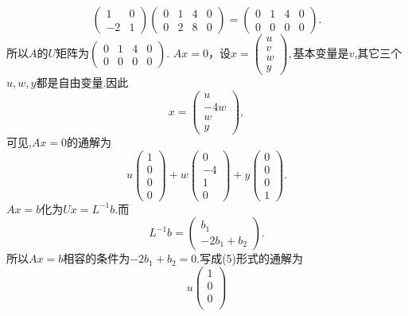 ﻿\documentclass{book} \usepackage{exsheets} \usepackage{xeCJK}
\begin{document}
\begin{solution}
$$
\begin{pmatrix}
  1&0\\
  -2&1
\end{pmatrix}
\begin{pmatrix}
  0&1&4&0\\
  0&2&8&0
\end{pmatrix}=
\begin{pmatrix}
  0&1&4&0\\
  0&0&0&0
\end{pmatrix}.
$$
所以$A$的$U$矩阵为$
\begin{pmatrix}
  0&1&4&0\\
  0&0&0&0
\end{pmatrix}.  $ $Ax=0$，设$x=
\begin{pmatrix}
  u\\
  v\\
  w\\
  y
\end{pmatrix}, $基本变量是$v$,其它三个$u,w,y$都是自由变量.因此
$$
x=
\begin{pmatrix}
  u\\
  -4w\\
  w\\
  y
\end{pmatrix},
$$
可见,$Ax=0$的通解为
$$
u
\begin{pmatrix}
  1\\
  0\\
  0\\
  0
\end{pmatrix}+ w\begin{pmatrix}
  0\\
  -4\\
  1\\
  0
\end{pmatrix}+y
\begin{pmatrix}
  0\\
  0\\
  0\\
  1
\end{pmatrix}.
$$
$Ax=b$化为$Ux=L^{-1}b$.而
$$
L^{-1}b=
\begin{pmatrix}
  b_1\\
  -2b_1+b_2
\end{pmatrix}.
$$
所以$Ax=b$相容的条件为$-2b_{1}+b_{2}=0$.写成(5)形式的通解为
$$
u
\begin{pmatrix}
  1\\
  0\\
  0\\

\end{pmatrix}$$
\end{solution}
\end{document}
